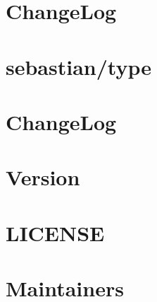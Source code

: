 \documentclass[twoside]{book}
\newcommand{\+}{\discretionary{\mbox{\scriptsize$\hookleftarrow$}}{}{}}
\begin{document}
\chapter{Change\+Log}
\label{md__c__workspace__proyecto__p_h_p_project_vendor_sebastian_type__change_log}

\chapter{sebastian/type}
\label{md__c__workspace__proyecto__p_h_p_project_vendor_sebastian_type__r_e_a_d_m_e}

\chapter{Change\+Log}
\label{md__c__workspace__proyecto__p_h_p_project_vendor_sebastian_version__change_log}

\chapter{Version}
\label{md__c__workspace__proyecto__p_h_p_project_vendor_sebastian_version__r_e_a_d_m_e}

\chapter{LICENSE}
\label{md__c__workspace__proyecto__p_h_p_project_vendor_slim_psr7__l_i_c_e_n_s_e}

\chapter{Maintainers}
\label{md__c__workspace__proyecto__p_h_p_project_vendor_slim_psr7__m_a_i_n_t_a_i_n_e_r_s}

\end{document}
